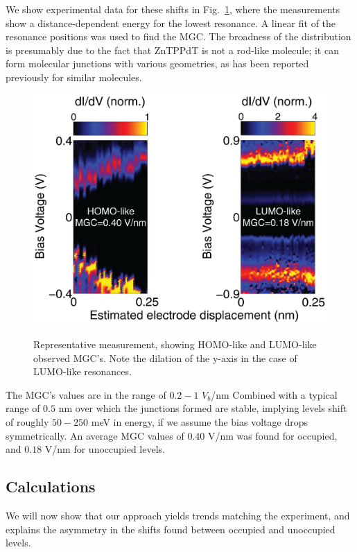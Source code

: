 \documentclass[aip,jcp,a4paper,reprint,floatfix,superscriptaddress]{revtex4-1}
\begin{document}
We show experimental data for these shifts in Fig.~\ref{fg:experiment}, where the measurements show a distance-dependent energy for the lowest resonance. A linear fit of the resonance positions was used to find the MGC. 
The broadness of the distribution is presumably due to the fact that ZnTPPdT is not a rod-like molecule; it can form molecular junctions with various geometries, as has been reported previously for similar molecules.\cite{Perrin2011b}

\begin{figure}
\includegraphics[width=.9\columnwidth]{Fig3TH}\label{fg:exp_measurement}

\caption{Representative measurement,\cite{Perrin2013} showing HOMO-like and LUMO-like observed MGC's. Note the dilation of the y-axis in the case of LUMO-like resonances. 
}
\label{fg:experiment}
\end{figure}

The MGC's values are 
in the range of $0.2-1$ $V_b$/nm 
Combined with a typical range of $0.5$ nm over which the junctions formed are stable, 
implying levels shift of roughly $50-250$ meV in energy, if we assume the bias voltage  drops symmetrically. An average MGC values of $0.40$ V/nm was found for occupied, and  $0.18$ V/nm for unoccupied levels.


\subsection{Calculations}\label{calculations}

We will now show that our approach yields trends matching the experiment, and explains the asymmetry in the shifts found between occupied and unoccupied levels. 
\end{document}
